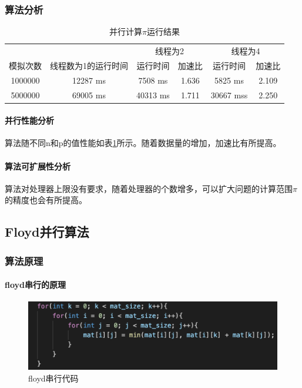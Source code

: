 \documentclass[10pt]{article}
\begin{document}
\subsubsection{算法分析}

\begin{table}[htbp]
    \centering
    \caption{并行计算$\pi$运行结果}
        \begin{tabular}{|c|c|c|c|c|c|}
        \hline
          &  & \multicolumn{2}{|c|}{线程为2} & \multicolumn{2}{|c|}{线程为4} \\ \cline{3-6}
        模拟次数 & 线程数为1的运行时间 & 运行时间 & 加速比 & 运行时间 & 加速比 \\
        \hline
        1000000 & 12287 ms & 7508 ms & 1.636 & 5825 ms & 2.109 \\
        \hline
        5000000 & 69005 ms & 40313 ms & 1.711 & 30667 mss & 2.250 \\
        \hline
        \end{tabular}
    \label{pi_table}
\end{table}

\paragraph{并行性能分析}

算法随不同n和p的值性能如表\ref{pi_table}所示。随着数据量的增加，加速比有所提高。

\paragraph{算法可扩展性分析}

算法对处理器上限没有要求，随着处理器的个数增多，可以扩大问题的计算范围$\pi$的精度也会有所提高。

\subsection{Floyd并行算法}

\subsubsection{算法原理}

\paragraph{floyd串行的原理}

\begin{figure}[htbp]
    \centering
    \includegraphics[width=.6\textwidth]{assets/floyd串行.png}
    \caption{floyd串行代码}
    \label{floyd串行代码}
\end{figure}
\end{document}
